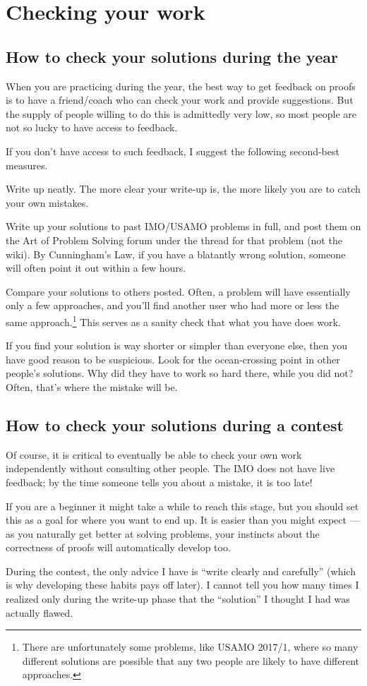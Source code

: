 \documentclass[11pt]{scrartcl}
\begin{document}
\pagebreak

\section{Checking your work}
\subsection{How to check your solutions during the year}
When you are practicing during the year,
the best way to get feedback on proofs is to have a friend/coach
who can check your work and provide suggestions.
But the supply of people willing to do this is admittedly very low,
so most people are not so lucky to have access to feedback.

If you don't have access to such feedback,
I suggest the following second-best measures.
\begin{itemize}
	\ii Write up neatly.
	The more clear your write-up is,
	the more likely you are to catch your own mistakes.

	\ii Write up your solutions to past IMO/USAMO problems in full,
	and post them on the Art of Problem Solving forum
	under the thread for that problem (not the wiki).
	By Cunningham's Law, if you have a blatantly wrong solution,
	someone will often point it out within a few hours.

	\ii Compare your solutions to others posted.
	Often, a problem will have essentially only a few approaches,
	and you'll find another user who had more or less
	the same approach.\footnote{There are unfortunately some problems,
		like USAMO 2017/1,
		where so many different solutions are possible
		that any two people are likely to have different approaches.}
	This serves as a sanity check that what you have does work.

	If you find your solution is way shorter or simpler
	than everyone else, then you have good reason to be suspicious.
	Look for the ocean-crossing point in other people's solutions.
	Why did they have to work so hard there, while you did not?
	Often, that's where the mistake will be.
\end{itemize}

\subsection{How to check your solutions during a contest}
Of course, it is critical to eventually
be able to check your own work independently
without consulting other people.
The IMO does not have live feedback;
by the time someone tells you about a mistake, it is too late!

If you are a beginner it might take a while to reach this stage,
but you should set this as a goal for where you want to end up.
It is easier than you might expect ---
as you naturally get better at solving problems, your instincts
about the correctness of proofs will automatically develop too.

During the contest, the only advice I have is
``write clearly and carefully''
(which is why developing these habits pays off later).
I cannot tell you how many times I realized only during the write-up phase
that the ``solution'' I thought I had was actually flawed.
\end{document}
